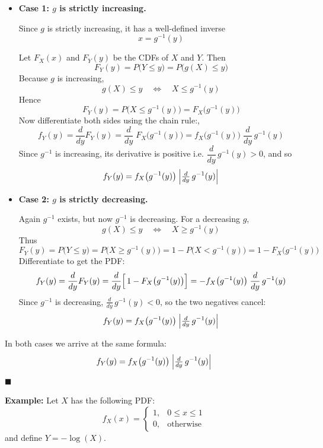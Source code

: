 \documentclass[twoside]{book}
\begin{document}
\begin{itemize}
\item  \textbf{Case 1: $g$ is strictly increasing.}

    Since $g$ is strictly increasing, it has a well-defined inverse
    \[
      x = g^{-1}(y)
    \]

    Let $F_X(x)$ and $F_Y(y)$ be the CDFs of $X$ and $Y$.  Then
    \[
      F_Y(y)
      = P\bigl(Y \le y\bigr)
      = P\bigl(g(X)\le y\bigr)
    \]
    Because $g$ is increasing,
    \[
      g(X)\le y
      \quad\Longleftrightarrow\quad
      X \le g^{-1}(y)
    \]
    Hence
    \[
      F_Y(y)
      = P\bigl(X \le g^{-1}(y)\bigr)
      = F_X\bigl(g^{-1}(y)\bigr)
    \]
  Now differentiate both sides using the chain rule:,
    \[
      f_Y(y)
      = \frac{d}{dy}F_Y(y)
      = \frac{d}{dy}\;F_X\bigl(g^{-1}(y)\bigr)
      = f_X\bigl(g^{-1}(y)\bigr)\;\frac{d}{dy}\,g^{-1}(y)
    \]
    Since $g^{-1}$ is increasing, its derivative is positive i.e. $\dfrac{d}{dy}\,g^{-1}(y) > 0$, and so
    \[
      f_Y(y)
      = f_X\bigl(g^{-1}(y)\bigr)\;\Bigl|\tfrac{d}{dy}\,g^{-1}(y)\Bigr|
    \]


\medskip
\item \textbf{Case 2: $g$ is strictly decreasing.}


    Again $g^{-1}$ exists, but now $g^{-1}$ is decreasing.
    For a decreasing $g$,
    \[
      g(X)\le y
      \quad\Longleftrightarrow\quad
      X \ge g^{-1}(y)
    \]
    Thus
    \[
      F_Y(y)
      = P\bigl(Y \le y\bigr)
      = P\bigl(X \ge g^{-1}(y)\bigr)
      = 1 - P\bigl(X < g^{-1}(y)\bigr)
      = 1 - F_X\bigl(g^{-1}(y)\bigr)
    \]
  Differentiate to get the PDF:
    \[
      f_Y(y)
      = \frac{d}{dy}F_Y(y)
      = \frac{d}{dy}\Bigl[\,1 - F_X\bigl(g^{-1}(y)\bigr)\Bigr]
      = -f_X\bigl(g^{-1}(y)\bigr)\;\frac{d}{dy}\,g^{-1}(y)
    \]
    Since $g^{-1}$ is decreasing, $\tfrac{d}{dy}\,g^{-1}(y)<0$, so the two negatives cancel:
    \[
      f_Y(y)
      = f_X\bigl(g^{-1}(y)\bigr)\;\Bigl|\tfrac{d}{dy}\,g^{-1}(y)\Bigr|
    \]
\end{itemize}
\medskip
\noindent In both cases we arrive at the same formula:
\[
  f_Y(y)
  = f_X\bigl(g^{-1}(y)\bigr)\;\Bigl|\tfrac{d}{dy}\,g^{-1}(y)\Bigr|
\]
\hfill\(\blacksquare\)

\vspace{2mm}

\textbf{Example:} Let $X$ has the following PDF:
\[
f_X(x) =
\begin{cases}
1, & 0 \le x \le 1 \\
0, & \text{otherwise}
\end{cases}
\]
and define $Y = -\log(X)$.
\end{document}
